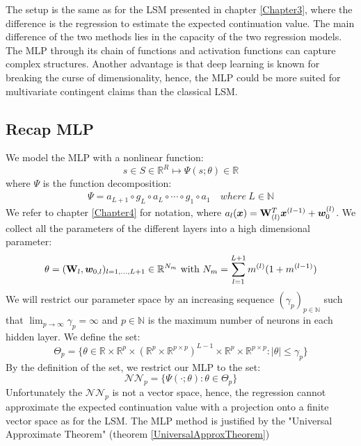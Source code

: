The setup is the same as for the LSM presented in chapter \ref{Chapter3}, where the difference is the regression to estimate the expected continuation value. The main difference of the two methods lies in the capacity of the two regression models. The MLP through its chain of functions and activation functions can capture complex structures. Another advantage is that deep learning is known for breaking the curse of dimensionality, hence, the MLP could be more suited for multivariate contingent claims than the classical LSM.

\subsection{Recap MLP}
We model the MLP with a nonlinear function:
$$s \in S \in \mathbb{R}^R \mapsto \Psi(s;\theta) \in \mathbb{R}$$
where $\Psi$ is the function decomposition:
\begin{align*}
\Psi = a_{L+1} \circ g_L \circ a_{L} \circ \cdots \circ g_1 \circ a_1 \quad where \ L\in \mathbb{N}
\end{align*}
We refer to chapter \ref{Chapter4} for notation, where $a_l(\bm{x})=\mathbf{W}_{(l)}^T \bm{x}^{(l-1)} + \bm{w}_{0}^{(l)}$. We collect all the parameters of the different layers into a high dimensional parameter:
$$\theta=(\mathbf{W}_l, \bm{w}_{0,l})_{l=1,\ldots,L+1} \in \mathbb{R}^{N_m} \text{ with } N_m=\sum_{l=1}^{L+1} m^{(l)} (1+ m^{(l-1)})$$
We will restrict our parameter space by an increasing sequence $(\gamma_p)_{p\in \mathbb{N}}$ such that $\lim_{p\to \infty} \gamma_p=\infty$ and $p\in \mathbb{N}$ is the maximum number of neurons in each hidden layer. We define the set:
$$\Theta_p = \{ \theta \in \mathbb{R} \times \mathbb{R}^p \times (\mathbb{R}^p \times \mathbb{R}^{p \times p})^{L-1} \times \mathbb{R}^{p} \times \mathbb{R}^{p \times p} : |\theta| \leq \gamma_p \}$$
By the definition of the set, we restrict our MLP to the set:
$$\mathcal{N} \mathcal{N}_p= \{ \Psi(\cdot;\theta) : \theta \in \Theta_p \}$$
Unfortunately the $\mathcal{N} \mathcal{N}_p$ is not a vector space, hence, the regression cannot approximate the expected continuation value with a projection onto a finite vector space as for the LSM. The MLP method is justified by the "Universal Approximate Theorem" (theorem \ref{UniversalApproxTheorem})

